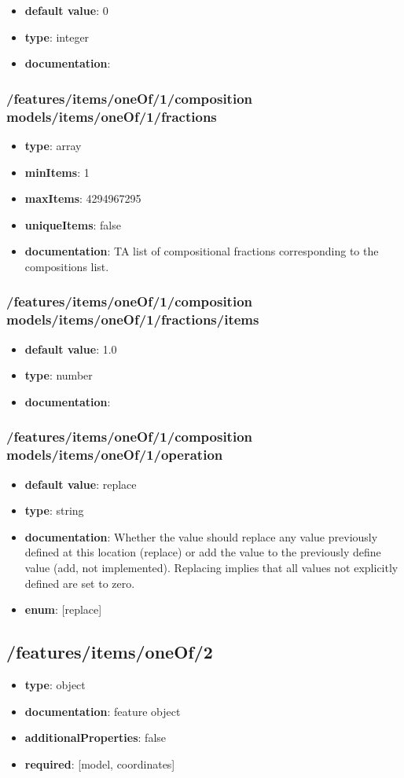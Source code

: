 \begin{itemize}\item {\bf default value}: 0
\item {\bf type}: integer
\item {\bf documentation}: 
\end{itemize}\subsubsection{/features/items/oneOf/1/composition models/items/oneOf/1/fractions}
\begin{itemize}\item {\bf type}: array
\item {\bf minItems}: 1
\item {\bf maxItems}: 4294967295
\item {\bf uniqueItems}: false
\item {\bf documentation}: TA list of compositional fractions corresponding to the compositions list.
\end{itemize}\subsubsection{/features/items/oneOf/1/composition models/items/oneOf/1/fractions/items}
\begin{itemize}\item {\bf default value}: 1.0
\item {\bf type}: number
\item {\bf documentation}: 
\end{itemize}\subsubsection{/features/items/oneOf/1/composition models/items/oneOf/1/operation}
\begin{itemize}\item {\bf default value}: replace
\item {\bf type}: string
\item {\bf documentation}: Whether the value should replace any value previously defined at this location (replace) or add the value to the previously define value (add, not implemented). Replacing implies that all values not explicitly defined are set to zero.
\item {\bf enum}: [replace]\end{itemize}\subsection{/features/items/oneOf/2}
\begin{itemize}\item {\bf type}: object
\item {\bf documentation}: feature object
\item {\bf additionalProperties}: false
\item {\bf required}: [model, coordinates]\end{itemize}
